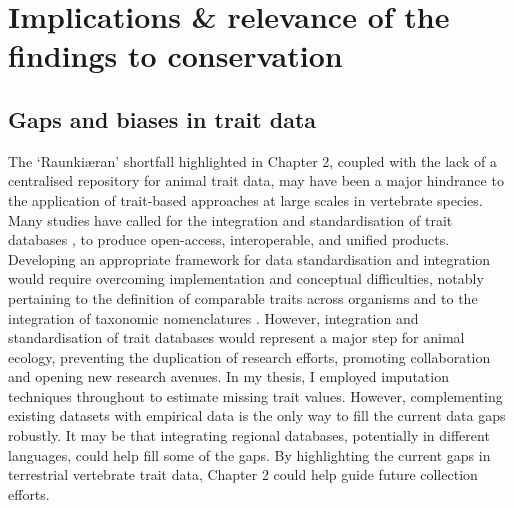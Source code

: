 

\section{Implications \& relevance of the findings to conservation}

\subsection{Gaps and biases in trait data}
The `Raunkiæran' shortfall highlighted in Chapter 2, coupled with the lack of a centralised repository for animal trait data, may have been a major hindrance to the application of trait-based approaches at large scales in vertebrate species. Many studies have called for the integration and standardisation of trait databases \citep{Kissling2018, Schneider2019, Weiss2019, Junker2022}, to produce open-access, interoperable, and unified products. Developing an appropriate framework for data standardisation and integration would require overcoming implementation and conceptual difficulties, notably pertaining to the definition of comparable traits across organisms and to the integration of taxonomic nomenclatures \citep{SalgueroGomez2021}. However, integration and standardisation of trait databases would represent a major step for animal ecology, preventing the duplication of research efforts, promoting collaboration and opening new research avenues. In my thesis, I employed imputation techniques throughout to estimate missing trait values. However, complementing existing datasets with empirical data is the only way to fill the current data gaps robustly. It may be that integrating regional databases, potentially in different languages, could help fill some of the gaps. By highlighting the current gaps in terrestrial vertebrate trait data, Chapter 2 could help guide future collection efforts. 

